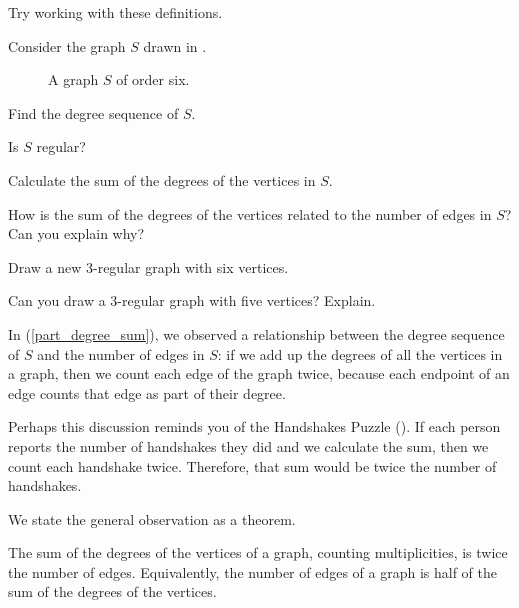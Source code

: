 Try working with these definitions.

\begin{act}[Degrees]
\label{act_deg_seq}
    Consider the graph $S$ drawn in .

    \begin{figure}
        \centering
        
        \caption{A graph $S$ of order six.}
        \label{fig_act_deg_seq}
    \end{figure}
   
    \begin{apart}
        \item Find the degree sequence of $S$.
        \item Is $S$ regular?
        \item Calculate the sum of the degrees of the vertices in $S$.
        \item \label{part_degree_sum} How is the sum of the degrees of the vertices related to the number of edges in $S$? Can you explain why? 
        \item Draw a new 3-regular graph with six vertices.
        \item \label{part_3reg_order5} Can you draw a 3-regular graph with five vertices?  Explain.
    \end{apart}
\end{act}

In  (\ref{part_degree_sum}), we observed a relationship between the degree sequence of $S$ and the number of edges in $S$: if we add up the degrees of all the vertices in a graph, then we count each edge of the graph twice, because each endpoint of an edge counts that edge as part of their degree.  

Perhaps this discussion reminds you of the Handshakes Puzzle (). If each person reports the number of handshakes they did and we calculate the sum, then we count each handshake twice. Therefore, that sum would be twice the number of handshakes. 

We state the general observation as a theorem. 

\begin{thm}
\label{thm_first_thm_graph_thy}
    The sum of the degrees of the vertices of a graph, counting multiplicities, is twice the number of edges.  Equivalently, the number of edges of a graph is half of the sum of the degrees of the vertices. 
\end{thm}

